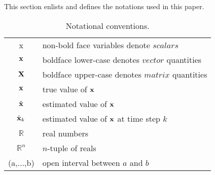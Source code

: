 \cyan
This section enlists and defines the notations used in this paper.
\begin{table}[h!]
	\centering
	\begin{tabular}[h]{|c|l|}
		\hline
		x 				& non-bold face variables denote $scalars$ 			\T \\
		$\mathbf{x}$ 		& boldface lower-case denotes $vector$ quantities	\T \\ 	
		$\mathbf{X}$ 		& boldface upper-case denotes $matrix$ quantities	\T \\
		$\mathbf{x}$ 		& true value of $\mathbf{x}$ 							\T \\  	
		$\hat{\mathbf{x}}$ 	& estimated value of $\mathbf{x}$						\T \\	
		$\hat{\mathbf{x}}_{k}$ & estimated value of $\mathbf{x}$ at time step $k$	\T \\	
		$\mathbb{R}$ 	& real numbers										\T \\ 	
		$\mathbb{R}^n$ 	& $n$-tuple of reals								\T \\
		(a,$\dots$,b) 	& open interval	between $a$ and $b$					\T \\
		\hline
		
	\end{tabular}
	\caption{Notational conventions.}
	\label{table:notation}
\end{table}

\black